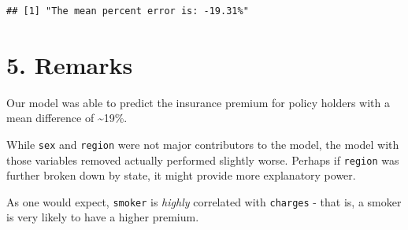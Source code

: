 \documentclass[]{article}
\begin{document}
\begin{verbatim}
## [1] "The mean percent error is: -19.31%"
\end{verbatim}

\section{5. Remarks}\label{remarks}

Our model was able to predict the insurance premium for policy holders
with a mean difference of \textasciitilde{}19\%.

While \texttt{sex} and \texttt{region} were not major contributors to
the model, the model with those variables removed actually performed
slightly worse. Perhaps if \texttt{region} was further broken down by
state, it might provide more explanatory power.

As one would expect, \texttt{smoker} is \emph{highly} correlated with
\texttt{charges} - that is, a smoker is very likely to have a higher
premium.
\end{document}
